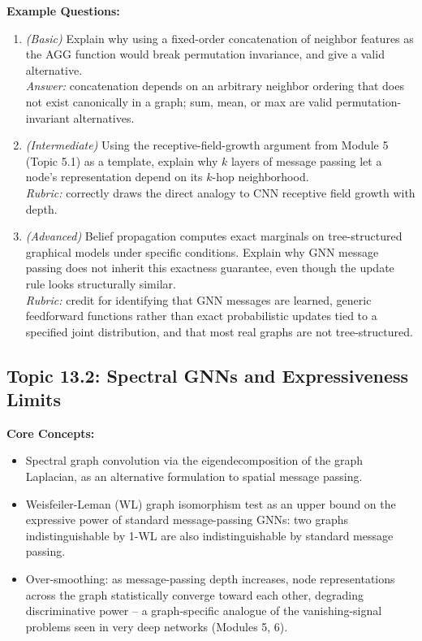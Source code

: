 \documentclass[11pt]{article}
\begin{document}
\textbf{Example Questions:}
\begin{enumerate}
  \item \textit{(Basic)} Explain why using a fixed-order concatenation of neighbor features as the AGG function would break permutation invariance, and give a valid alternative. \\
  \textit{Answer:} concatenation depends on an arbitrary neighbor ordering that does not exist canonically in a graph; sum, mean, or max are valid permutation-invariant alternatives.
  \item \textit{(Intermediate)} Using the receptive-field-growth argument from Module 5 (Topic 5.1) as a template, explain why $k$ layers of message passing let a node's representation depend on its $k$-hop neighborhood. \\
  \textit{Rubric:} correctly draws the direct analogy to CNN receptive field growth with depth.
  \item \textit{(Advanced)} Belief propagation computes exact marginals on tree-structured graphical models under specific conditions. Explain why GNN message passing does not inherit this exactness guarantee, even though the update rule looks structurally similar. \\
  \textit{Rubric:} credit for identifying that GNN messages are learned, generic feedforward functions rather than exact probabilistic updates tied to a specified joint distribution, and that most real graphs are not tree-structured.
\end{enumerate}

\subsection{Topic 13.2: Spectral GNNs and Expressiveness Limits}

\textbf{Core Concepts:}
\begin{itemize}
  \item Spectral graph convolution via the eigendecomposition of the graph Laplacian, as an alternative formulation to spatial message passing.
  \item Weisfeiler-Leman (WL) graph isomorphism test as an upper bound on the expressive power of standard message-passing GNNs: two graphs indistinguishable by 1-WL are also indistinguishable by standard message passing.
  \item Over-smoothing: as message-passing depth increases, node representations across the graph statistically converge toward each other, degrading discriminative power -- a graph-specific analogue of the vanishing-signal problems seen in very deep networks (Modules 5, 6).
\end{itemize}
\end{document}
